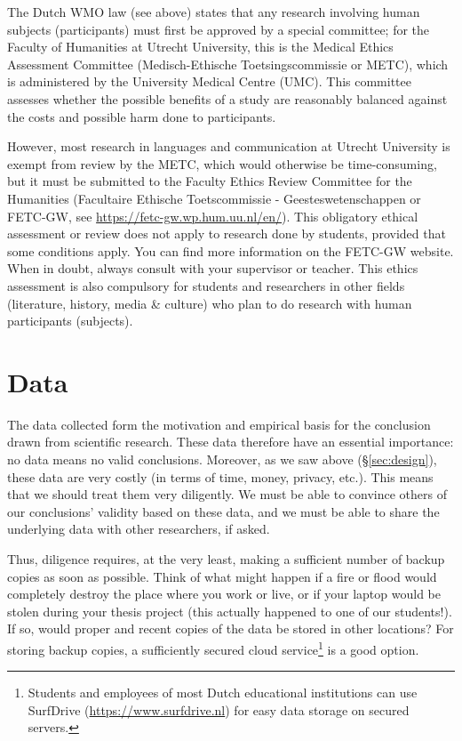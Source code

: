 \documentclass[
]{book}
\begin{document}
The Dutch WMO law (see above) states that any research involving human subjects (participants) must first be approved by a special committee; for the Faculty of Humanities at Utrecht University, this is the Medical Ethics Assessment Committee (Medisch-Ethische Toetsingscommissie or METC), which is administered by the University Medical Centre (UMC). This committee assesses whether the possible benefits of a study are reasonably balanced against the costs and possible harm done to participants.

However, most research in languages and communication at Utrecht University is exempt from review by the METC, which would otherwise be time-consuming, but it must be submitted to the Faculty Ethics Review Committee for the Humanities (Facultaire Ethische Toetscommissie - Geesteswetenschappen or FETC-GW, see \url{https://fetc-gw.wp.hum.uu.nl/en/}).
This obligatory ethical assessment or review does not apply to research done by students, provided that some conditions apply.
You can find more information on the FETC-GW website. When in doubt, always consult with your supervisor or teacher.
This ethics assessment is also compulsory for students and researchers in other fields (literature, history, media \& culture) who plan to do research with human participants (subjects).

\hypertarget{data}{%
\section{Data}\label{data}}

The data collected form the motivation and empirical basis for the conclusion drawn from scientific research. These data therefore have an essential importance: no data means no valid conclusions. Moreover, as we saw above (§\ref{sec:design}), these data are very costly (in terms of time, money, privacy, etc.). This means that we should treat them very diligently. We must be able to convince others of our conclusions' validity based on these data, and we must be able to share the underlying data with other researchers, if asked.

Thus, diligence requires, at the very least, making a sufficient number of backup copies as soon as possible. Think of what might happen if a fire or flood would completely destroy the place where you work or live, or if your laptop would be stolen during your thesis project (this actually happened to one of our students!). If so, would proper and recent copies of the data be stored in other locations? For storing backup copies, a sufficiently secured cloud service\footnote{Students and employees of most Dutch educational institutions can use SurfDrive (\url{https://www.surfdrive.nl}) for easy data storage on secured servers.} is a good option.
\end{document}
